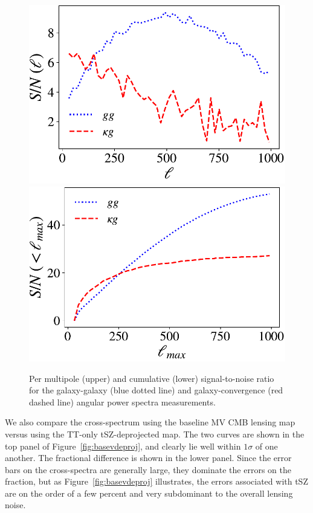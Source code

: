 \begin{figure}
\includegraphics[width=0.9\linewidth]{figures/snr.pdf}
\vspace{1cm}
\includegraphics[width=0.9\linewidth]{figures/snr_cum.pdf}
\caption{Per multipole (upper) and cumulative (lower) signal-to-noise ratio for the galaxy-galaxy (blue dotted line) and galaxy-convergence (red dashed line) angular power spectra measurements.}
\label{fig:snr}
\end{figure}

We also compare the cross-spectrum using the baseline MV CMB lensing map versus using the TT-only tSZ-deprojected map. The two curves are shown in the top panel of Figure~\ref{fig:basevdeproj}, and clearly lie well within $1\sigma$ of one another. The fractional difference is shown in the lower panel. Since the error bars on the cross-spectra are generally large, they dominate the errors on the fraction, but as Figure~\ref{fig:basevdeproj} illustrates, the errors associated with tSZ are on the order of a few percent and very subdominant to the overall lensing noise.

